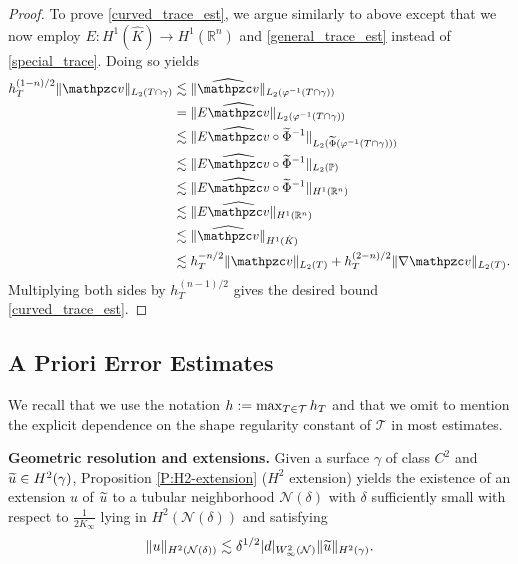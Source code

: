 \begin{proof}
To prove \eqref{curved_trace_est}, we argue similarly to above except that we now employ
$E:H^1(\hat K) \to H^1(\mathbb{R}^n)$ and \eqref{general_trace_est} instead of \eqref{special_trace}.  Doing so yields
$$\begin{aligned}
 h_T^{(1-n)/2} \|\tv\|_{L_2(T \cap \gamma)} & \lesssim \|\widehat{\tv}\|_{L_2(\varphi^{-1}(T \cap \gamma))}
\\ & = \|E \widehat{\tv}\|_{L_2(\varphi^{-1} (T \cap \gamma))}
\\ & \lesssim \|E \widehat{\tv} \circ \widetilde\Phi^{-1}\|_{L_2(\widetilde\Phi( \varphi^{-1}(T \cap \gamma)))}
\\ & \lesssim \|E \widehat{\tv} \circ \widetilde\Phi^{-1}\|_{L_2(\mathbb{P})}
\\ & \lesssim \|E \widehat{\tv} \circ \widetilde\Phi^{-1}\|_{H^1 (\mathbb{R}^n)}
\\ & \lesssim \|E \widehat{\tv}\|_{H^1(\mathbb{R}^n)}
\\ & \lesssim \|\widehat{\tv}\|_{H^1(\hat{K})}
\\ & \lesssim h_T^{-n/2} \|\tv\|_{L_2(T)} + h_T^{(2-n)/2} \|\nabla \tv\|_{L_2(T)}.
\end{aligned}$$
Multiplying both sides by $h_T^{(n-1)/2}$ gives the desired bound \eqref{curved_trace_est}.
\end{proof}

\subsection{A Priori Error Estimates}\label{S:trace-apriori}

We recall that we use the notation $ h := \max_{T \in \mathcal{T}} h_T$ and that we omit to mention the explicit dependence on the shape regularity constant of $\mathcal T$ in most estimates.

\medskip\noindent
{\bf Geometric resolution and extensions.}  %
%
Given a surface $\gamma$ of class $C^2$ and $\widetilde{u} \in H^2(\gamma)$, 
Proposition \ref{P:H2-extension} ($H^2$ extension) yields the existence of an extension $u$ of $\widetilde{u}$ to a tubular neighborhood $\mathcal{N}(\delta)$ with $\delta$ sufficiently small with respect to $\frac{1}{2 K_\infty}$ lying in $H^2(\mathcal{N(\delta)})$ and satisfying
\begin{align}
\label{H2extend}
\|u\|_{H^2(\mathcal{N}(\delta))} \lesssim \delta^{1/2} |d|_{W_\infty^2(\mathcal{N})}\|\widetilde{u}\|_{H^2(\gamma)}.
\end{align}

